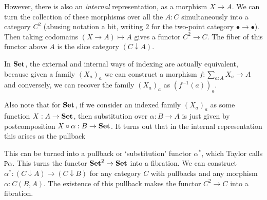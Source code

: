 However, there is also an \textit{internal} representation, as a morphism $ X \to A $. We can turn the collection of these morphisms over all the $ A : C $ simultaneously into a category $ C^2 $ (abusing notation a bit, writing $ 2 $ for the two-point category $ \bullet \to \bullet $). Then taking codomains $ (X \to A) \mapsto A $ gives a functor $ C^2 \to C $. The fiber of this functor above $ A $ is the slice category $ (C \downarrow A) $.

In $ \mathbf{Set} $, the external and internal ways of indexing are actually equivalent, because given a family $ (X_a)_a $ we can construct a morphism $ f: \sum_{a : A} X_a \to A $ and conversely, we can recover the family $ (X_a)_a $ as $ (f^{-1}(a))_a $.

Also note that for $ \mathbf{Set} $, if we consider an indexed family $ (X_a)_a $ as some function $ X: A \to \mathbf{Set} $, then substitution over $ \alpha: B \to A $ is just given by postcomposition $ X \circ \alpha: B \to \mathbf{Set} $. It turns out that in the internal representation this arises as the pullback
\begin{center}
\end{center}
This can be turned into a pullback or `substitution' functor $ \alpha^* $, which Taylor calls $ \mathtt{P}\alpha $. This turns the functor $ \mathbf{Set}^2 \to \mathbf{Set} $ into a fibration. We can construct $ \alpha^* : (C \downarrow A) \to (C \downarrow B) $ for any category $ C $ with pullbacks and any morphism $ \alpha: C(B, A) $. The existence of this pullback makes the functor $ C^2 \to C $ into a fibration.

